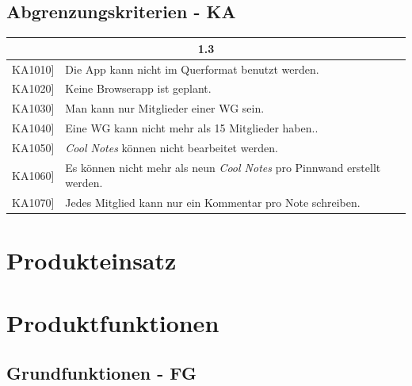 \documentclass[a4paper]{scrreprt}
\begin{document}
		\vspace{1cm}
		\clearpage
		
        \section{Abgrenzungskriterien - KA}
        
        \begin{table}[h!]
        	\centering
        	\label{my-label}
        	\begin{tabular}{p{2cm}p{12cm}}
        		
        		\multicolumn{2}{c}{\textbf{1.3}} \\ \hline
        		\centering{[}KA1010{]} & Die App kann nicht im Querformat benutzt werden.\\
        		\centering{[}KA1020{]}& Keine Browserapp ist geplant.                                 \\
        		\centering{[}KA1030{]}& Man kann nur Mitglieder einer WG sein.\\ 
        		\centering{[}KA1040{]}& Eine WG kann nicht mehr als 15 Mitglieder haben..\\ 
        		\centering{[}KA1050{]}& \textit{Cool Notes} können nicht bearbeitet werden.\\ 
        		\centering{[}KA1060{]}& Es können nicht mehr als neun \textit{Cool Notes} pro Pinnwand erstellt werden.\\ 
        		\centering{[}KA1070{]}& Jedes Mitglied kann nur ein Kommentar pro Note schreiben.\\ 
        		\hline
        	\end{tabular}
        \end{table}

    \chapter{Produkteinsatz}
    
        

    \chapter{Produktfunktionen}
    		\section{Grundfunktionen - FG}
    		
\end{document}
